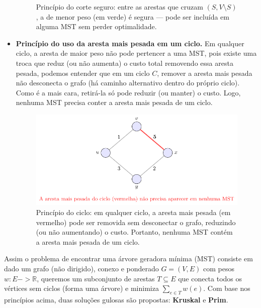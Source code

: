 \documentclass[12pt,a4paper]{article}
\def\emph#1{#1}%
\def\to{->}%
\begin{document}
\begin{itemize}
\begin{figure}[H]
    \caption{Princípio do corte seguro: entre as arestas que cruzam \((S, V\setminus S)\), a de menor peso (em verde) é \emph{segura} — pode ser incluída em alguma MST sem perder optimalidade.}
    \label{fig:mst-cut-safe}
\end{figure}
    \item \textbf{Princípio do uso da aresta mais pesada em um ciclo.} Em qualquer \emph{ciclo}, a aresta de maior peso \emph{não} pode pertencer a uma MST, pois existe uma troca que reduz (ou não aumenta) o custo total removendo essa aresta pesada, podemos entender que em um ciclo \(C\), remover a aresta \emph{mais pesada} não desconecta o grafo (há caminho alternativo dentro do próprio ciclo). Como é a mais cara, retirá-la só pode reduzir (ou manter) o custo. Logo, nenhuma MST precisa conter a aresta mais pesada de um ciclo.


\begin{figure}[H]
    \centering
    \includegraphics[width=0.9\linewidth]{figures/fig_mst_cycle_heavy.pdf}

    \caption{Princípio do ciclo: em qualquer ciclo, a aresta mais pesada (em vermelho) pode ser removida sem desconectar o grafo, reduzindo (ou não aumentando) o custo. Portanto, nenhuma MST contém a aresta mais pesada de um ciclo.}
    \label{fig:mst-cycle-heavy}\end{figure}

\end{itemize}

Assim o problema de encontrar uma árvore geradora mínima (MST) consiste em dado um grafo (não dirigido), conexo e ponderado \(G=(V,E)\) com pesos \(w:E\to\mathbb{R}\), queremos um subconjunto de arestas \(T\subseteq E\) que conecta todos os vértices sem ciclos (forma uma árvore) e minimiza \(\sum_{e\in T} w(e)\). 
Com base nos princípios acima, duas soluções gulosas são propostas: \textbf{Kruskal} e \textbf{Prim}.
\end{document}
